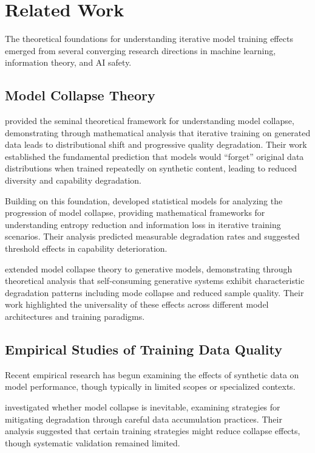 \documentclass[11pt]{article}
\begin{document}
\section{Related Work}

The theoretical foundations for understanding iterative model training effects emerged from several converging research directions in machine learning, information theory, and AI safety.

\subsection{Model Collapse Theory}

\citet{shumailov2023curse} provided the seminal theoretical framework for understanding model collapse, demonstrating through mathematical analysis that iterative training on generated data leads to distributional shift and progressive quality degradation. Their work established the fundamental prediction that models would ``forget'' original data distributions when trained repeatedly on synthetic content, leading to reduced diversity and capability degradation.

Building on this foundation, \citet{seddik2024bad} developed statistical models for analyzing the progression of model collapse, providing mathematical frameworks for understanding entropy reduction and information loss in iterative training scenarios. Their analysis predicted measurable degradation rates and suggested threshold effects in capability deterioration.

\citet{alemohammad2023self} extended model collapse theory to generative models, demonstrating through theoretical analysis that self-consuming generative systems exhibit characteristic degradation patterns including mode collapse and reduced sample quality. Their work highlighted the universality of these effects across different model architectures and training paradigms.

\subsection{Empirical Studies of Training Data Quality}

Recent empirical research has begun examining the effects of synthetic data on model performance, though typically in limited scopes or specialized contexts.

\citet{gerstgrasser2024model} investigated whether model collapse is inevitable, examining strategies for mitigating degradation through careful data accumulation practices. Their analysis suggested that certain training strategies might reduce collapse effects, though systematic validation remained limited.
\end{document}
